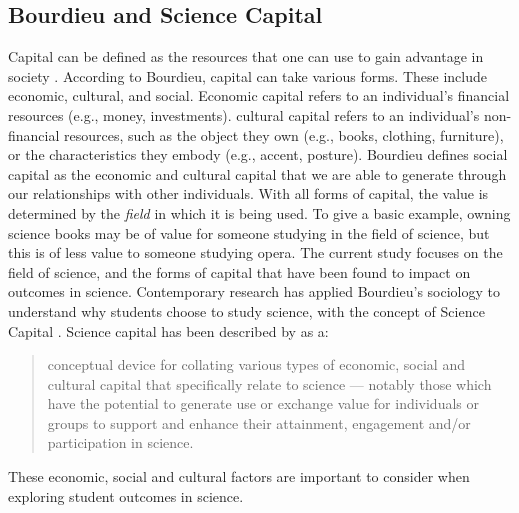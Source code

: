 \subsection*{Bourdieu and Science Capital}
\label{sciencecapital}
Capital can be defined as the resources that one can use to gain advantage in society \cite{Bourdieu_1986}. According to Bourdieu, capital can take various forms. These include economic, cultural, and social. Economic capital refers to an individual's financial resources (e.g., money, investments). cultural capital refers to an individual's non-financial resources, such as the object they own (e.g., books, clothing, furniture), or the characteristics they embody (e.g., accent, posture). Bourdieu defines social capital as the economic and cultural capital that we are able to generate through our relationships with other individuals. With all forms of capital, the value is determined by the \textit{field} in which it is being used. To give a basic example, owning science books may be of value for someone studying in the field of science, but this is of less value to someone studying opera. The current study focuses on the field of science, and the forms of capital that have been found to impact on outcomes in science. Contemporary research has applied Bourdieu's sociology to understand why students choose to study science, with the concept of Science Capital \cite{Archer_2015}. Science capital has been described by \cite{Archer2014} as a:
\begin{quote}
conceptual device for collating various types of economic, social and cultural capital that specifically relate to science --- notably those which have the potential to generate use or exchange value for individuals or groups to support and enhance their attainment, engagement and/or participation in science.
\end{quote}
These economic, social and cultural factors are important to consider when exploring student outcomes in science. 

